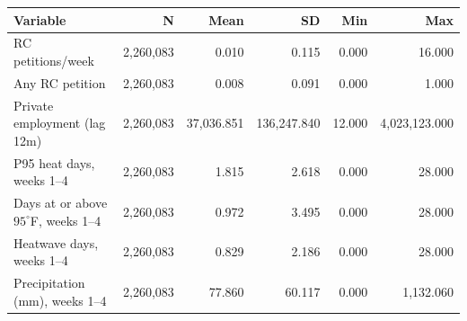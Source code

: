 \begin{tabular}{lrrrrr}
\toprule
Variable & N & Mean & SD & Min & Max \\
\midrule
RC petitions/week & 2,260,083 & 0.010 & 0.115 & 0.000 & 16.000 \\
Any RC petition & 2,260,083 & 0.008 & 0.091 & 0.000 & 1.000 \\
Private employment (lag 12m) & 2,260,083 & 37,036.851 & 136,247.840 & 12.000 & 4,023,123.000 \\
P95 heat days, weeks 1--4 & 2,260,083 & 1.815 & 2.618 & 0.000 & 28.000 \\
Days at or above $95^\circ$F, weeks 1--4 & 2,260,083 & 0.972 & 3.495 & 0.000 & 28.000 \\
Heatwave days, weeks 1--4 & 2,260,083 & 0.829 & 2.186 & 0.000 & 28.000 \\
Precipitation (mm), weeks 1--4 & 2,260,083 & 77.860 & 60.117 & 0.000 & 1,132.060 \\
\bottomrule
\end{tabular}
